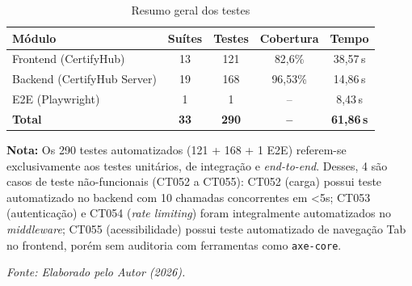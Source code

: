\begin{table}[H]
\centering
\caption{Resumo geral dos testes}
\label{tab:testes-resumo}
\begin{tabularx}{\textwidth}{Xcccc}
\toprule
\textbf{Módulo} & \textbf{Suítes} & \textbf{Testes} & \textbf{Cobertura} & \textbf{Tempo} \\
\midrule
Frontend (CertifyHub) & 13 & 121 & 82,6\% & 38,57\,s \\
Backend (CertifyHub Server) & 19 & 168 & 96,53\% & 14,86\,s \\
E2E (Playwright) & 1 & 1 & -- & 8,43\,s \\
\midrule
\textbf{Total} & \textbf{33} & \textbf{290} & \textbf{--} & \textbf{61,86\,s} \\
\bottomrule
\end{tabularx}
\par\vspace{6pt}
\mbox{}\vspace{6pt}\par
\footnotesize\noindent\textbf{Nota:} Os 290 testes automatizados (121 + 168 + 1 E2E) referem-se exclusivamente aos testes unitários, de integração e \textit{end-to-end}. Desses, 4 são casos de teste não-funcionais (CT052 a CT055): CT052 (carga) possui teste automatizado no backend com 10 chamadas concorrentes em \textless 5s; CT053 (autenticação) e CT054 (\textit{rate limiting}) foram integralmente automatizados no \textit{middleware}; CT055 (acessibilidade) possui teste automatizado de navegação Tab no frontend, porém sem auditoria com ferramentas como \texttt{axe-core}.
\par\vspace{4pt}
\end{table}
\noindent\raggedright\small\textit{Fonte: Elaborado pelo Autor (2026).}
